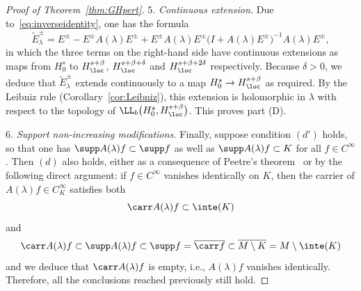 \begin{proof}[Proof of Theorem~\ref{thm:GHpert}]
 	\emph{$5.$ Continuous extension.} Due to~\eqref{eq:inverseidentity}, one has the formula
 	\begin{equation*}
 		\tilde{E}_\lambda^\pm = E^\pm - E^\pm A(\lambda)E^\pm + E^\pm A(\lambda)E^\pm \big(I+ A(\lambda)E^\pm\big)^{-1}A(\lambda)E^\pm,
 	\end{equation*}
 	in which the three terms on the right-hand side have continuous
 	extensions as maps from $H^s_0$ to $H^{s+\beta}_\loc$, $H^{s+\beta+\delta}_\loc$ and $H^{s+\beta+2\delta}_\loc$ respectively. Because $\delta>0$, we deduce that $\tilde{E}^\pm_\lambda$
 	extends continuously to a map $H^s_0\to H_\loc^{s+\beta}$ as required.
 	By the Leibniz rule (Corollary~\ref{cor:Leibniz}), this extension is holomorphic in $\lambda$ with respect to the topology of $\LL_b\big(H^s_0,H_\loc^{s+\beta}\big)$.
 	This proves part (D).
 	
 	
 	\emph{$6.$ Support non-increasing modifications.} Finally, suppose condition $(d')$ holds, so that one has $\supp A(\lambda)f\subset \supp f$ as well as
 	$\supp A(\lambda)f\subset K$ for all $f\in C^\infty$. Then $(d)$ also holds,
 	either as a consequence of Peetre's theorem~\cite{Peetre:1960} or by the
 	following direct argument:
 	if $f\in C^\infty$ vanishes identically on $K$, then the carrier of $A(\lambda)f\in C^\infty_K$ satisfies
 	both
 	\begin{equation*}
 		\carr A(\lambda)f \subset \inte(K)
 	\end{equation*}
 	and
 	\begin{equation*}
 		\carr A(\lambda)f\subset \supp A(\lambda)f\subset \supp f=\overline{\carr f}\subset \overline{M\setminus K} = M\setminus \inte(K)
 	\end{equation*}
 	and we deduce that $\carr A(\lambda)f$ is empty, i.e., $A(\lambda)f$ vanishes identically. Therefore, all the conclusions reached previously still hold.
 	

\end{proof}
